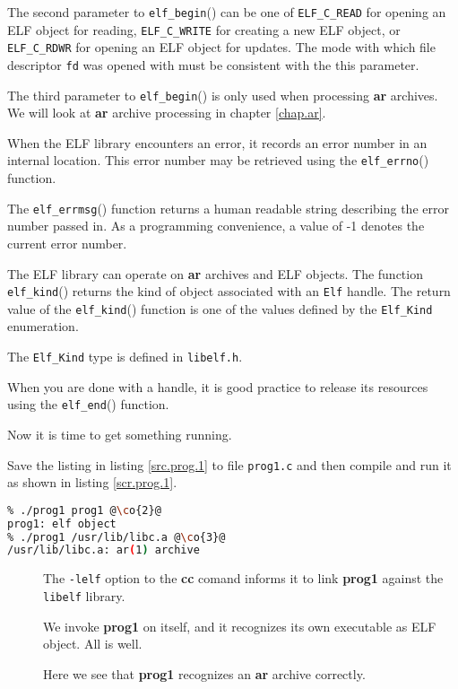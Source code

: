 \documentclass[a4paper]{report}
\newcommand{\function}[1]{\texttt{#1}()}
\newcommand{\library}[1]{\texttt{#1}}
\newcommand{\constant}[1]{\texttt{#1}}
\newcommand{\filename}[1]{\texttt{#1}}
\newcommand{\parameter}[1]{\texttt{#1}}
\newcommand{\tool}[1]{\textbf{#1}}
\newcommand{\type}[1]{\texttt{#1}}
\newcommand{\co}[1]{\framebox{\textbf{\color{blue}#1}}}
\begin{document}
\begin{description}
    The second parameter to \function{elf\_begin} can be one of
    \constant{ELF\_C\_READ} for opening an ELF object for reading,
    \constant{ELF\_C\_WRITE} for creating a new ELF object, or
    \constant{ELF\_C\_RDWR} for opening an ELF object for updates.
    The mode with which file descriptor \parameter{fd} was opened with
    must be consistent with the this parameter.

    The third parameter to \function{elf\_begin} is only used when
    processing \tool{ar} archives.  We will look at \tool{ar} archive
    processing in chapter \vref{chap.ar}.

  \item[\co{6}] When the ELF library encounters an error, it records
    an error number in an internal location.  This error number may be
    retrieved using the \function{elf\_errno} function.

    The \function{elf\_errmsg} function returns a human readable
    string describing the error number passed in.  As a programming
    convenience, a value of -1 denotes the current error number.

  \item[\co{3} \co{7}] The ELF library can operate on \tool{ar}
    archives and ELF objects.  The function \function{elf\_kind}
    returns the kind of object associated with an \type{Elf} handle.
    The return value of the \function{elf\_kind} function is one of
    the values defined by the \type{Elf\_Kind} enumeration.

    The \type{Elf\_Kind} type is defined in \filename{libelf.h}.

  \item[\co{8}] When you are done with a handle, it is good practice
    to release its resources using the \function{elf\_end} function.
\end{description}

Now it is time to get something running.

Save the listing in listing \vref{src.prog.1} to file
\filename{prog1.c} and then compile and run it as shown in listing
\vref{scr.prog.1}.

\begin{lstlisting}[language=sh,caption=Compiling and running prog1,label=scr.prog.1]
% cc -o prog1 prog1.c -lelf @\co{1}@
% ./prog1 prog1 @\co{2}@
prog1: elf object
% ./prog1 /usr/lib/libc.a @\co{3}@
/usr/lib/libc.a: ar(1) archive
\end{lstlisting}

\begin{description}
  \item[\co{1}] The \parameter{-lelf} option to the \tool{cc} comand
    informs it to link \tool{prog1} against the \library{libelf}
    library.
  \item[\co{2}] We invoke \tool{prog1} on itself, and it recognizes
    its own executable as ELF object.  All is well.
  \item[\co{3}] Here we see that \tool{prog1} recognizes an \tool{ar}
    archive correctly.
\end{description}
\end{document}
